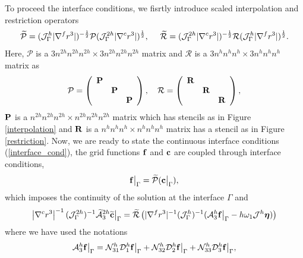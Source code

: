 To proceed the interface conditions, we fisrtly introduce scaled interpolation and restriction operators
\[\widetilde{\mathcal{P}} = (\mathcal{J}^h_\Gamma |\nabla^f r^3|)^{-\frac{1}{2}}\mathcal{P}(\mathcal{J}^{2h}_\Gamma |\nabla^c r^3|)^{\frac{1}{2}},\ \ \ \ \widetilde{\mathcal{R}} =  (\mathcal{J}^{2h}_\Gamma |\nabla^c r^3|)^{-\frac{1}{2}}\mathcal{R}(\mathcal{J}^{h}_\Gamma |\nabla^f r^3|)^{\frac{1}{2}}.\]
Here, $\mathcal{P}$ is a $3n^{2h}n^{2h}n^{2h}\times 3n^{2h}n^{2h}n^{2h}$ matrix and $\mathcal{R}$ is a $3n^hn^hn^h\times 3n^hn^hn^h$ matrix as 
\begin{align}\label{iandr}
\mathcal{P} = \left(\begin{array}{ccc}
{\bf P}& ~  & ~ \\
~ & {\bf P} & ~ \\
~ &~  &{\bf P}\end{array}\right),\ \ \ \mathcal{R} = \left(\begin{array}{ccc}
{\bf R}& ~  & ~ \\
~ & {\bf R} & ~ \\
~ &~  &{\bf R}\end{array}\right),
\end{align}
$\bf P$ is a $n^{2h}n^{2h}n^{2h}\times n^{2h}n^{2h}n^{2h}$ matrix which has stencils as in Figure \ref{interpolation} and $\bf R$ is a $n^hn^hn^h\times n^hn^hn^h$ matrix has a stencil as in Figure \ref{restriction}. Now, we are ready to state the continuous interface conditions (\ref{interface_cond}), the grid functions ${\bf f}$ and ${\bf c}$ are coupled through interface conditions,
\begin{equation}\label{continuous_sol}
{\bf f}\big|_{\Gamma} = \wt{\mathcal{P}}({\bf c}\big|_{\Gamma}),
\end{equation}
which imposes the continuity of the solution at the interface $\Gamma$
and
\begin{equation}\label{continuous_traction}
\left|\nabla^c r^{3}\right|^{-1}({\mathcal J}_{\Gamma}^{2h})^{-1}\wt{\mathcal{A}}_3^{2h}\wt{\bf c}\big|_\Gamma
= \wt{\mathcal{R}}\left(|\nabla^f r^{3}|^{-1}({\mathcal J}^h_{\Gamma})^{-1}(\mathcal{A}_3^h{\bf f}\big|_\Gamma-h\omega_1{\mathcal J}^h{\bm \eta})\right)
\end{equation}
where we have used the notations
\begin{equation}\label{hatAf}
\mathcal{A}_3^h{\bf f}\big|_\Gamma = \mathcal{N}_{31}^{h}\mathcal{D}^h_1{\bf f}\big|_\Gamma + \mathcal{N}_{32}^h\mathcal{D}^h_2{\bf f}\big|_\Gamma + \mathcal{N}_{33}^h\mathcal{D}_3^h{\bf f}\big|_\Gamma,
\end{equation}
